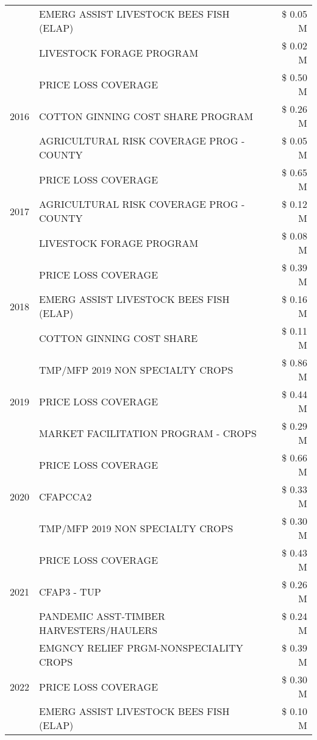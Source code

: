 \begin{tabular}{llr}
 & EMERG ASSIST LIVESTOCK BEES FISH (ELAP) & \$ 0.05 M \\
 & LIVESTOCK FORAGE PROGRAM & \$ 0.02 M \\
\cline{1-3}
\multirow[t]{3}{*}{2016} & PRICE LOSS COVERAGE & \$ 0.50 M \\
 & COTTON GINNING COST SHARE PROGRAM & \$ 0.26 M \\
 & AGRICULTURAL RISK COVERAGE PROG - COUNTY & \$ 0.05 M \\
\cline{1-3}
\multirow[t]{3}{*}{2017} & PRICE LOSS COVERAGE & \$ 0.65 M \\
 & AGRICULTURAL RISK COVERAGE PROG - COUNTY & \$ 0.12 M \\
 & LIVESTOCK FORAGE PROGRAM & \$ 0.08 M \\
\cline{1-3}
\multirow[t]{3}{*}{2018} & PRICE LOSS COVERAGE & \$ 0.39 M \\
 & EMERG ASSIST LIVESTOCK BEES FISH (ELAP) & \$ 0.16 M \\
 & COTTON GINNING COST SHARE & \$ 0.11 M \\
\cline{1-3}
\multirow[t]{3}{*}{2019} & TMP/MFP 2019 NON SPECIALTY CROPS & \$ 0.86 M \\
 & PRICE LOSS COVERAGE & \$ 0.44 M \\
 & MARKET FACILITATION PROGRAM - CROPS & \$ 0.29 M \\
\cline{1-3}
\multirow[t]{3}{*}{2020} & PRICE LOSS COVERAGE & \$ 0.66 M \\
 & CFAPCCA2 & \$ 0.33 M \\
 & TMP/MFP 2019 NON SPECIALTY CROPS & \$ 0.30 M \\
\cline{1-3}
\multirow[t]{3}{*}{2021} & PRICE LOSS COVERAGE & \$ 0.43 M \\
 & CFAP3 - TUP & \$ 0.26 M \\
 & PANDEMIC ASST-TIMBER HARVESTERS/HAULERS & \$ 0.24 M \\
\cline{1-3}
\multirow[t]{3}{*}{2022} & EMGNCY RELIEF PRGM-NONSPECIALITY CROPS & \$ 0.39 M \\
 & PRICE LOSS COVERAGE & \$ 0.30 M \\
 & EMERG ASSIST LIVESTOCK BEES FISH (ELAP) & \$ 0.10 M \\
\cline{1-3}
\bottomrule
\end{tabular}
